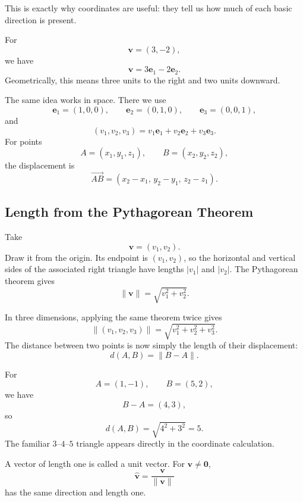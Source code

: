 This is exactly why coordinates are useful: they tell us how much of each basic
direction is present.

\begin{examplebox}
For
\[
\mathbf v=(3,-2),
\]
we have
\[
\mathbf v=3\mathbf e_1-2\mathbf e_2.
\]
Geometrically, this means three units to the right and two units downward.
\end{examplebox}

The same idea works in space.  There we use
\[
\mathbf e_1=(1,0,0),
\qquad
\mathbf e_2=(0,1,0),
\qquad
\mathbf e_3=(0,0,1),
\]
and
\[
(v_1,v_2,v_3)
=
v_1\mathbf e_1+v_2\mathbf e_2+v_3\mathbf e_3.
\]
For points
\[
A=(x_1,y_1,z_1),
\qquad
B=(x_2,y_2,z_2),
\]
the displacement is
\[
\overrightarrow{AB}
=
(x_2-x_1,\,y_2-y_1,\,z_2-z_1).
\]

\subsection{Length from the Pythagorean Theorem}

Take
\[
\mathbf v=(v_1,v_2).
\]
Draw it from the origin.  Its endpoint is $(v_1,v_2)$, so the horizontal and
vertical sides of the associated right triangle have lengths $|v_1|$ and
$|v_2|$.  The Pythagorean theorem gives
\[
\|\mathbf v\|
=
\sqrt{v_1^2+v_2^2}.
\]

\begin{center}
\end{center}

In three dimensions, applying the same theorem twice gives
\[
\|(v_1,v_2,v_3)\|
=
\sqrt{v_1^2+v_2^2+v_3^2}.
\]
The distance between two points is now simply the length of their displacement:
\[
d(A,B)=\|B-A\|.
\]

\begin{examplebox}
For
\[
A=(1,-1),
\qquad
B=(5,2),
\]
we have
\[
B-A=(4,3),
\]
so
\[
d(A,B)=\sqrt{4^2+3^2}=5.
\]
The familiar $3$--$4$--$5$ triangle appears directly in the coordinate
calculation.
\end{examplebox}

A vector of length one is called a unit vector.  For $\mathbf v\neq\mathbf0$,
\[
\widehat{\mathbf v}
=
\frac{\mathbf v}{\|\mathbf v\|}
\]
has the same direction and length one.

